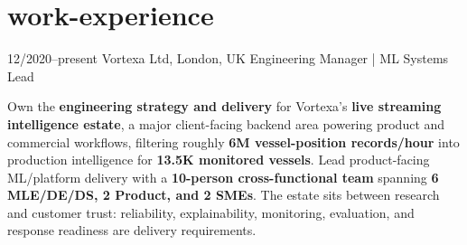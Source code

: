 \documentclass[]{../../../../friggeri-cv}
\begin{document}
\section{work-experience}
\begin{entrylist}
	\entry
	{12/2020–present}
	{Vortexa Ltd, London, UK}
		{Engineering Manager | ML Systems Lead}
	{
    	{\small
	    \setlength{\parindent}{0pt}
	    \setlength{\leftskip}{0pt}
								    Own the \textbf{engineering strategy and delivery} for Vortexa's \textbf{live streaming intelligence estate}, a major client-facing backend area powering product and commercial workflows, filtering roughly \textbf{6M vessel-position records/hour} into production intelligence for \textbf{13.5K monitored vessels}. Lead product-facing ML/platform delivery with a \textbf{10-person cross-functional team} spanning \textbf{6 MLE/DE/DS, 2 Product, and 2 SMEs}. The estate sits between research and customer trust: reliability, explainability, monitoring, evaluation, and response readiness are delivery requirements.

}}
\end{entrylist}
\end{document}

